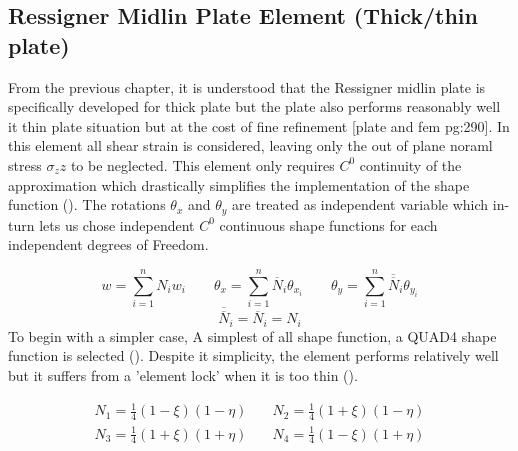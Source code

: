 \documentclass[main.tex]{subfiles}
\begin{document}
\subsection{Ressigner Midlin Plate Element (Thick/thin plate)}

From the previous chapter, it is understood that the Ressigner midlin plate is specifically developed for thick plate but the plate also performs reasonably well it thin plate situation but at the cost of fine refinement [plate and fem pg:290]. In this element all shear strain is considered, leaving only the out of plane noraml stress $\sigma_zz$ to be neglected. This element only requires $C^0$ continuity of the approximation  which drastically simplifies the implementation of the shape function (\cite{ANA_FEM_Plate_MIT}). The rotations $\theta_x$ and $\theta_y$ are treated as independent variable which in-turn lets us chose independent $C^0$ continuous shape functions for each independent degrees of Freedom.

\begin{equation}\label{eq:approx_disp_Ind}
w =  \sum_{i=1}^{n} N_iw_i
\qquad
\theta_x =  \sum_{i=1}^{n} \overline{N}_i\theta_{x_i}
\qquad
\theta_y =  \sum_{i=1}^{n} \overline{\overline{N}}_i\theta_{y_i}
\end{equation}
 \begin{equation*}
\overline{\overline{N}}_i = \overline{N}_i = N_i
 \end{equation*}
To begin with a simpler case, A simplest of all shape function, a QUAD4 shape function is selected  (\cite{MATLAB_FEM}). Despite it simplicity, the element performs relatively well but it suffers from a 'element lock' when it is too thin (\cite{doi:10.1002/nme.1620210213}).

 
\begin{equation}\label{eq:MITC4_SF}
\begin{split}
N_1  =\frac{1}{4}(1-\xi)(1 -\eta)\quad  
&
 N_2=\frac{1}{4}(1+\xi)(1-\eta) 
 \\
 N_3  =\frac{1}{4}(1+\xi)(1+ \eta)\quad  
 &
  N_4 =\frac{1}{4}(1-\xi)(1+\eta)\end{split}
\end{equation}
\end{document}
